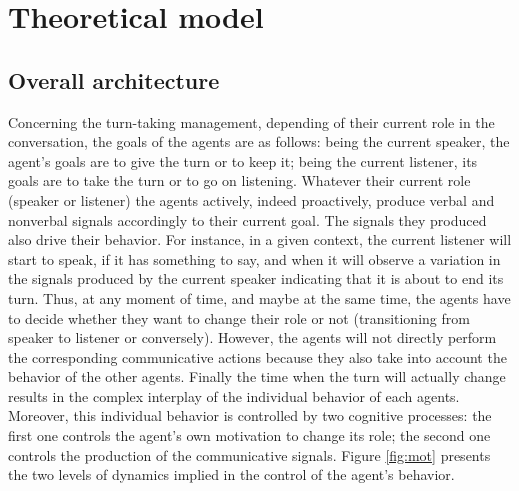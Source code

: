\section{Theoretical model}
\label{mod_pres}

\subsection{Overall architecture}

Concerning the turn-taking management, depending of their current role in the conversation, the goals of the agents are as follows: being the current speaker, the agent's goals are to give the turn or to keep it; being the current listener, its goals are to take the turn or to go on listening. Whatever their current role (speaker or listener) the agents actively, indeed proactively, produce verbal and nonverbal signals accordingly to their current goal. 
The signals they produced also drive their behavior. For instance, in a given context, the current listener will start to speak, if it has something to say, and when it will observe a variation in the signals produced by the current speaker indicating that it is about to end its turn. 
Thus, at any moment of time, and maybe at the same time, the agents have to decide whether they want to change their role or not (transitioning from speaker to listener or conversely). However, the agents will not directly perform the corresponding communicative actions because they also take into account the behavior of the other agents. 
Finally the time when the turn will actually change results in the complex interplay of the individual behavior of each agents. Moreover, this individual behavior is controlled by two cognitive processes: the first one controls the agent's own motivation to change its role; the second one controls the production of the communicative signals. 
Figure \ref{fig:mot} presents the two levels of dynamics implied in the control of the agent's behavior.


